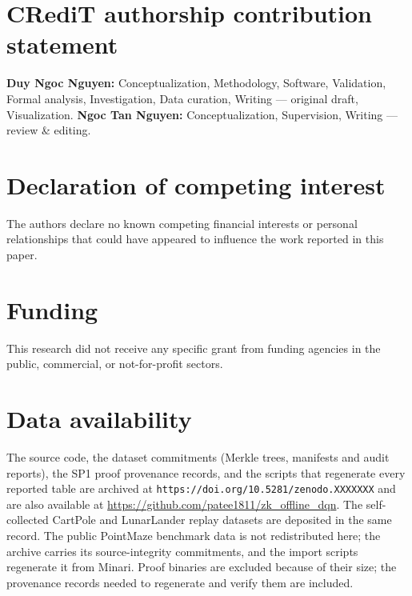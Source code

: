 
\section*{CRediT authorship contribution statement}

\textbf{Duy Ngoc Nguyen:} Conceptualization, Methodology, Software,
Validation, Formal analysis, Investigation, Data curation, Writing --- original
draft, Visualization.
\textbf{Ngoc Tan Nguyen:} Conceptualization, Supervision, Writing --- review
\& editing.

\section*{Declaration of competing interest}

The authors declare no known competing financial interests or personal
relationships that could have appeared to influence the work reported in this
paper.

\section*{Funding}

This research did not receive any specific grant from funding agencies in the
public, commercial, or not-for-profit sectors.

\section*{Data availability}

The source code, the dataset commitments (Merkle trees, manifests and audit
reports), the SP1 proof provenance records, and the scripts that regenerate
every reported table are archived at
\texttt{https://doi.org/10.5281/zenodo.XXXXXXX} and are also available at
\url{https://github.com/patee1811/zk_offline_dqn}. The self-collected CartPole and
LunarLander replay datasets are deposited in the same record.
The public PointMaze benchmark data is not redistributed here; the archive
carries its source-integrity commitments, and the import scripts regenerate it
from Minari. Proof binaries are excluded because of their size; the provenance
records needed to regenerate and verify them are included.

